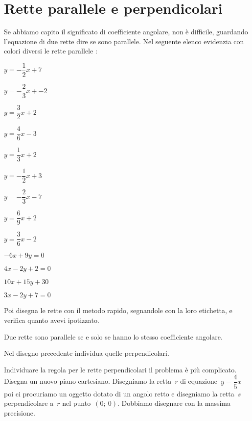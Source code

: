 
\section{Rette parallele e perpendicolari}
\label{sec:retta_paralleleleperpendicolari}

Se abbiamo capito il significato di coefficiente angolare, non è difficile, 
guardando l'equazione di due rette dire se sono parallele. Nel seguente 
elenco evidenzia con colori diversi le rette parallele :

\begin{multicols}{4}
 \TabPositions{0.6cm}
 \begin{enumeratea}
 \item \(y=-\dfrac{1}{2}x + 7\)
 \item \(y=-\dfrac{2}{3}x + -2\)
 \item \(y=\dfrac{3}{2}x + 2\)
 \item \(y=\dfrac{4}{6}x - 3\)
 \item \(y=\dfrac{1}{3}x + 2\)
 \item \(y=-\dfrac{1}{2}x + 3\)
 \item \(y=-\dfrac{2}{3}x - 7\)
 \item \(y=\dfrac{6}{9}x + 2\)
 \item \(y=\dfrac{3}{6}x - 2\)
 \item \(-6x + 9y = 0\) \\[-.8em]
 \item \(4x - 2y + 2 = 0\) \\[-.8em]
 \item \(10x + 15y + 30\) \\[-.8em]
 \item \(3x -2y + 7 = 0\)
 \end{enumeratea}
\end{multicols}

Poi disegna le rette con il metodo rapido, segnandole con la loro etichetta, 
e verifica quanto avevi ipotizzato. 

\begin{definizione}
Due rette sono parallele se e solo se hanno lo stesso coefficiente angolare.
\end{definizione}

Nel disegno precedente individua quelle perpendicolari.

Individuare la regola per le rette perpendicolari il problema è più 
complicato. 
Disegna un nuovo piano cartesiano.
Disegniamo la retta~\(r\) di equazione~\(y = \dfrac{4}{5} x\) poi 
ci procuriamo un oggetto dotato di un angolo retto e disegniamo la 
retta~\(s\) perpendicolare a~\(r\) nel punto~\((0;~0)\). 
Dobbiamo disegnare con la massima precisione. 

